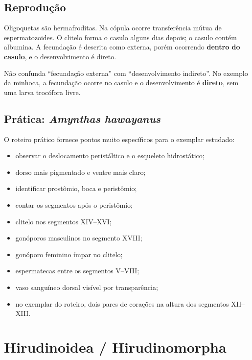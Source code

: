 \documentclass[a4paper,12pt]{article}
\begin{document}
\subsection{Reprodução}

Oligoquetas são hermafroditas. Na cópula ocorre transferência mútua de espermatozoides. O clitelo forma o casulo alguns dias depois; o casulo contém albumina. A fecundação é descrita como externa, porém ocorrendo \textbf{dentro do casulo}, e o desenvolvimento é direto.

\begin{pontoprova}
Não confunda ``fecundação externa'' com ``desenvolvimento indireto''. No exemplo da minhoca, a fecundação ocorre no casulo e o desenvolvimento é \textbf{direto}, sem uma larva trocófora livre.
\end{pontoprova}

\subsection{Prática: \textit{Amynthas hawayanus}}

O roteiro prático fornece pontos muito específicos para o exemplar estudado:

\begin{itemize}
  \item observar o deslocamento peristáltico e o esqueleto hidrostático;
  \item dorso mais pigmentado e ventre mais claro;
  \item identificar prostômio, boca e peristômio;
  \item contar os segmentos após o peristômio;
  \item clitelo nos segmentos XIV--XVI;
  \item gonóporos masculinos no segmento XVIII;
  \item gonóporo feminino ímpar no clitelo;
  \item espermatecas entre os segmentos V--VIII;
  \item vaso sanguíneo dorsal visível por transparência;
  \item no exemplar do roteiro, dois pares de corações na altura dos segmentos XII--XIII.
\end{itemize}

\section{Hirudinoidea / Hirudinomorpha}
\end{document}
